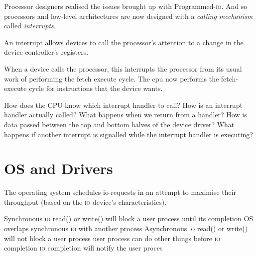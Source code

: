 Processor designers realised the issues brought up with Programmed-\textsc{io}.
And so processors and low-level architectures are now designed with a
\textit{calling mechanism} called \textit{interrupts}.



An interrupt allows devices to call the processor’s attention to a 
change in the device controller’s registers.

When a device calls the processor, this interrupts the processor 
from its usual work of performing the fetch execute cycle. 
The cpu now performs the fetch-execute cycle for instructions that the device wants. 

How does the CPU know which interrupt handler to call?
How is an interrupt handler actually called?
What happens when we return from a handler?
How is data passed between the top and bottom halves of the device driver?
What happens if another interrupt is signalled while the interrupt handler is executing?




\section{OS and Drivers}





The operating system schedules io-requests in an attempt to maximise their throughput (based on the \textsc{io} device’s characteristics).






Synchronous \textsc{io} read() or write() will block a user process until its completion 
OS overlaps synchronous \textsc{io} with another process 
Asynchronous \textsc{io} read() or write() will not block a user process 
user process can do other things before \textsc{io} completion 
\textsc{io} completion will notify the user proces
